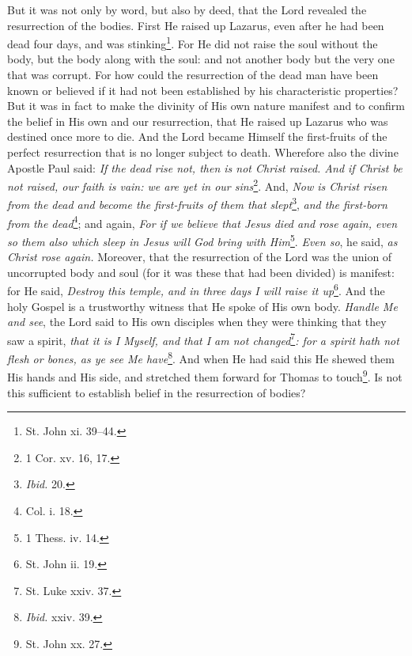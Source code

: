 But it was not only by word, but also by deed, that the Lord revealed the resurrection of the bodies. First He raised up Lazarus, even after he had been dead four days, and was stinking\footnote{St. John xi. 39–44.}. For He did not raise the soul without the body, but the body along with the soul: and not another body but the very one that was corrupt. For how could the resurrection of the dead man have been known or believed if it had not been established by his characteristic properties? But it was in fact to make the divinity of His own nature manifest and to confirm the belief in His own and our resurrection, that He raised up Lazarus who was destined once more to die. And the Lord became Himself the first-fruits of the perfect resurrection that is no longer subject to death. Wherefore also the divine Apostle Paul said: \emph{If the dead rise not, then is not Christ raised. And if Christ be not raised, our faith is vain: we are yet in our sins}\footnote{1 Cor. xv. 16, 17.}. And, \emph{Now is Christ risen from the dead and become the first-fruits of them that slept}\footnote{\emph{Ibid.} 20.}, \emph{and the first-born from the dead}\footnote{Col. i. 18.}; and again, \emph{For if we believe that Jesus died and rose again, even so them also which sleep in Jesus will God bring with Him}\footnote{1 Thess. iv. 14.}. \emph{Even so}, he said, \emph{as Christ rose again. }Moreover, that the resurrection of the Lord was the union of uncorrupted body and soul (for it was these that had been divided) is manifest: for He said, \emph{Destroy this temple, and in three days I will raise it up}\footnote{St. John ii. 19.}. And the holy Gospel is a trustworthy witness that He spoke of His own body. \emph{Handle Me and see}, the Lord said to His own disciples when they were thinking that they saw a spirit, \emph{that it is I Myself, and that I am not changed}\footnote{St. Luke xxiv. 37.}\emph{: for a spirit hath not flesh or bones, as ye see Me have}\footnote{\emph{Ibid.} xxiv. 39.}. And when He had said this He shewed them His hands and His side, and stretched them forward for Thomas to touch\footnote{St. John xx. 27.}. Is not this sufficient to establish belief in the resurrection of bodies?


